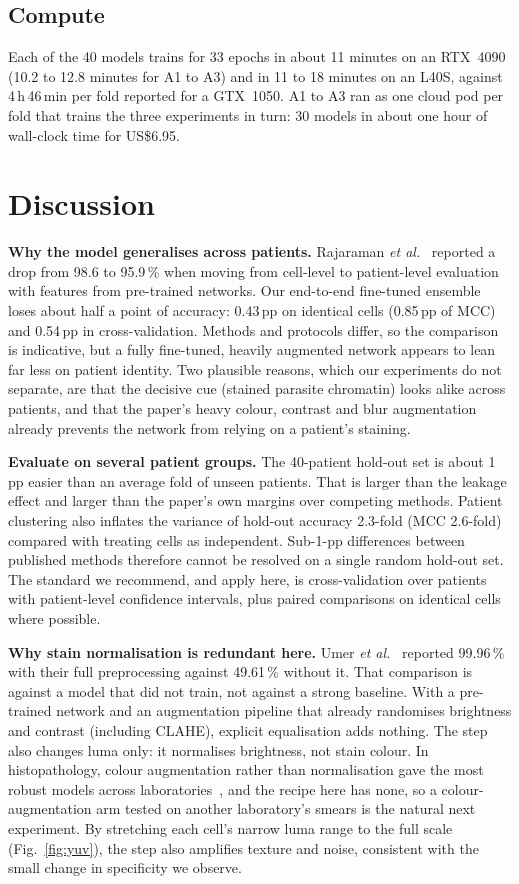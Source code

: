 \documentclass[conference]{IEEEtran}
\begin{document}
\subsection{Compute}
Each of the 40 models trains for 33 epochs in about 11 minutes on an RTX~4090 (10.2 to 12.8 minutes for A1 to A3) and in 11 to 18 minutes on an L40S, against 4\,h\,46\,min per fold reported for a GTX~1050. A1 to A3 ran as one cloud pod per fold that trains the three experiments in turn: 30 models in about one hour of wall-clock time for US\$6.95.

\section{Discussion}
\label{sec:discussion}
\textbf{Why the model generalises across patients.} Rajaraman \emph{et al.}~\cite{rajaraman2018} reported a drop from 98.6 to 95.9\,\% when moving from cell-level to patient-level evaluation with features from pre-trained networks. Our end-to-end fine-tuned ensemble loses about half a point of accuracy: 0.43\,pp on identical cells (0.85\,pp of MCC) and 0.54\,pp in cross-validation. Methods and protocols differ, so the comparison is indicative, but a fully fine-tuned, heavily augmented network appears to lean far less on patient identity. Two plausible reasons, which our experiments do not separate, are that the decisive cue (stained parasite chromatin) looks alike across patients, and that the paper's heavy colour, contrast and blur augmentation already prevents the network from relying on a patient's staining.

\textbf{Evaluate on several patient groups.} The 40-patient hold-out set is about 1\,pp easier than an average fold of unseen patients. That is larger than the leakage effect and larger than the paper's own margins over competing methods. Patient clustering also inflates the variance of hold-out accuracy 2.3-fold (MCC 2.6-fold) compared with treating cells as independent. Sub-1-pp differences between published methods therefore cannot be resolved on a single random hold-out set. The standard we recommend, and apply here, is cross-validation over patients with patient-level confidence intervals, plus paired comparisons on identical cells where possible.

\textbf{Why stain normalisation is redundant here.} Umer \emph{et al.}~\cite{umer2020} reported 99.96\,\% with their full preprocessing against 49.61\,\% without it. That comparison is against a model that did not train, not against a strong baseline. With a pre-trained network and an augmentation pipeline that already randomises brightness and contrast (including CLAHE), explicit equalisation adds nothing. The step also changes luma only: it normalises brightness, not stain colour. In histopathology, colour augmentation rather than normalisation gave the most robust models across laboratories~\cite{tellez2019}, and the recipe here has none, so a colour-augmentation arm tested on another laboratory's smears is the natural next experiment. By stretching each cell's narrow luma range to the full scale (Fig.~\ref{fig:yuv}), the step also amplifies texture and noise, consistent with the small change in specificity we observe.
\end{document}
